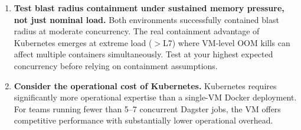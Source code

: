 \begin{enumerate}
  \item \textbf{Test blast radius containment under sustained memory pressure, not just nominal load.}
  Both environments successfully contained blast radius at moderate concurrency.
  The real containment advantage of Kubernetes emerges at extreme load ($>$L7) where VM-level OOM kills can affect multiple containers simultaneously.
  Test at your highest expected concurrency before relying on containment assumptions.

  \item \textbf{Consider the operational cost of Kubernetes.}
  Kubernetes requires significantly more operational expertise than a single-VM Docker deployment.
  For teams running fewer than 5--7 concurrent Dagster jobs, the VM offers competitive performance with substantially lower operational overhead.
\end{enumerate}


